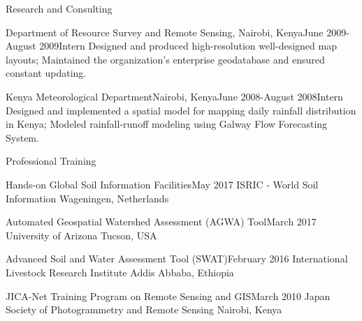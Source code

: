 \documentclass{resume} %
\begin{document}
\begin{rSection}{Research and Consulting}
\begin{pSubsection}{Department of Resource Survey and Remote Sensing, }{Nairobi, Kenya}{June 2009-August 2009}{Intern}
{Designed and produced high-resolution well-designed map layouts; Maintained the organization's enterprise geodatabase and ensured constant updating.}
\end{pSubsection}

\begin{pSubsection}{Kenya Meteorological Department}{Nairobi, Kenya}{June 2008-August 2008}{Intern}
{Designed and implemented a spatial model for mapping daily rainfall distribution in Kenya; Modeled rainfall-runoff modeling using Galway Flow Forecasting System.}
\end{pSubsection}
\end{rSection}



\begin{rSection}{Professional Training}

\begin{sSubsection}{Hands-on Global Soil Information Facilities}{}{May 2017}{ ISRIC - World Soil Information }{Wageningen, Netherlands}
\end{sSubsection}

\begin{sSubsection}{Automated Geospatial Watershed Assessment (AGWA) Tool}{}{March 2017}{ University of Arizona }{Tucson, USA}
\end{sSubsection}

\begin{sSubsection}{Advanced Soil and Water Assessment Tool (SWAT)}{}{February 2016}{ International Livestock Research Institute }{Addis Abbaba, Ethiopia}
\end{sSubsection}

\begin{sSubsection}{JICA-Net Training Program on Remote Sensing and GIS}{}{March 2010}{ Japan Society of Photogrammetry and Remote Sensing }{Nairobi, Kenya}
\end{sSubsection}

\end{rSection}

\end{document}
